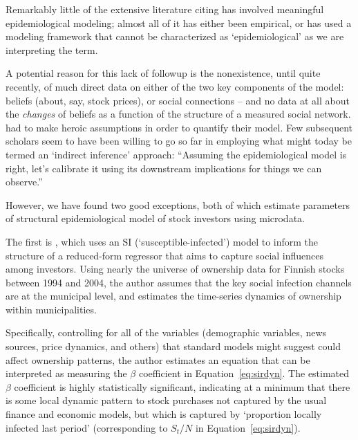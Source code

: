 Remarkably little of the extensive literature citing \cite{shiller1989survey} has involved meaningful epidemiological modeling; almost all of it has either been empirical, or has used a modeling framework that cannot be characterized as `epidemiological' as we are interpreting the term. %

A potential reason for this lack of followup is the nonexistence, until quite recently, of much direct data on either of the two key components of the model: beliefs (about, say, stock prices), or social connections -- and no data at all about the \textit{changes} of beliefs as a function of the structure of a measured social network.  \cite{shiller1989survey} had to make heroic assumptions in order to quantify their model.  Few subsequent scholars seem to have been willing to go so far in employing what might today be termed an `indirect inference' approach: ``Assuming the epidemiological model is right, let's calibrate it using its downstream implications for things we can observe.''

However, we have found two good exceptions, both of which estimate parameters of structural epidemiological model of stock investors using microdata.

The first is  \href{https://github.com/iworld1991/EpiExp/blob/master/Literature/shive2010epidemic.pdf}{\cite{shive2010epidemic}}, which uses an SI (`susceptible-infected') model to inform the structure of a reduced-form regressor that aims to capture social influences among investors.  Using nearly the universe of ownership data for Finnish stocks between 1994 and 2004, the author assumes that the key social infection channels are at the municipal level, and estimates the time-series dynamics of ownership within municipalities.

Specifically, controlling for all of the variables (demographic variables, news sources, price dynamics, and others) that standard models might suggest could affect ownership patterns, the author estimates an equation that can be interpreted as measuring the $\beta$ coefficient in Equation~\eqref{eq:sirdyn}.  The estimated $\beta$ coefficient is highly statistically significant, indicating at a minimum that there is some local dynamic pattern to stock purchases not captured by the usual finance and economic models, but which is captured by `proportion locally infected last period' (corresponding to $S_t/N$ in Equation~\eqref{eq:sirdyn}).  %

